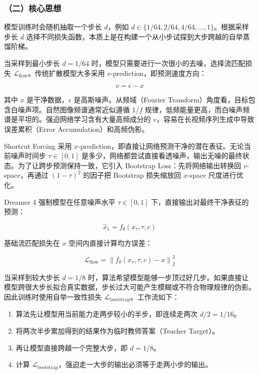 \hypertarget{ux4e8cux6838ux5fc3ux601dux60f3-4}{%
\subsubsection{（二）核心思想}\label{ux4e8cux6838ux5fc3ux601dux60f3-4}}

模型训练时会随机抽取一个步长 \(d\)，例如 \(d\in\{1/64,2/64,4/64,\ldots,1\}\)。根据采样步长 \(d\) 选择不同损失函数，本质上是在构建一个从小步试探到大步跨越的自举蒸馏阶梯。

当采样到最小步长 \(d=1/64\) 时，模型只需要进行一次很小的去噪，选择流匹配损失 \(\mathcal{L}_{\mathrm{flow}}\)。传统扩散模型大多采用 \(v\)-prediction，即预测速度方向：

\[
v=\epsilon-x
\]

其中 \(x\) 是干净数据，\(\epsilon\) 是高斯噪声。从频域（Fourier Transform）角度看，目标包含白噪声项。自然图像频谱通常近似遵循 \(1/f\) 规律，低频能量更高，而白噪声频谱是平坦的。强迫网络学习含有大量高频成分的 \(v\)，容易在长视频序列生成中导致误差累积（Error Accumulation）和高频伪影。

Shortcut Forcing 采用 \(x\)-prediction，即直接让网络预测干净的潜在表征。无论当前噪声时间步 \(\tau\in[0,1]\) 是多少，网络都尝试直接看透噪声，输出无噪的最终状态。为了让跨步预测保持一致，它引入 Bootstrap Loss：先将网络输出转换回 \(v\)-space，再通过 \((1-\tau)^2\) 的因子把 Bootstrap 损失缩放回 \(x\)-space 尺度进行优化。

Dreamer 4 强制模型在任意噪声水平 \(\tau\in[0,1]\) 下，直接输出对最终干净表征的预测：

\[
\hat{x}_1=f_\theta(x_\tau,\tau,c)
\]

基础流匹配损失在 \(x\) 空间内直接计算均方误差：

\[
\mathcal{L}_{\mathrm{flow}}=\left\|f_\theta(x_\tau,\tau,c)-x\right\|_2^2
\]

当采样到较大步长 \(d=1/8\) 时，算法希望模型能够一步顶过好几步。如果直接让模型跨很大步长拟合真实数据，步长过大可能产生模糊或不符合物理规律的伪影。因此训练时使用自举一致性损失 \(\mathcal{L}_{\mathrm{bootstrap}}\)。工作流如下：

\begin{enumerate}
\def\labelenumi{\arabic{enumi}.}
\tightlist
\item
  算法先让模型用当前能力走两步较小的半步，即连续走两次 \(d/2=1/16\)。
\item
  将两次半步累加得到的结果作为临时教师答案（Teacher Target）。
\item
  再让模型直接跨越一个完整大步，即 \(d=1/8\)。
\item
  计算 \(\mathcal{L}_{\mathrm{bootstrap}}\)，强迫走一大步的输出必须等于走两小步的输出。
\end{enumerate}

